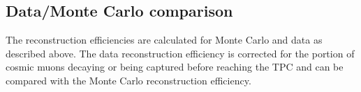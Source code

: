 \documentclass[a4paper,11pt]{article}
\begin{document}




\subsection{Data/Monte Carlo comparison}\label{sec:datamc}
The reconstruction efficiencies are calculated for Monte Carlo and data as described above. The data reconstruction efficiency is corrected for the portion of cosmic muons decaying or being captured before reaching the TPC and can be compared with the Monte Carlo reconstruction efficiency.
\end{document}
